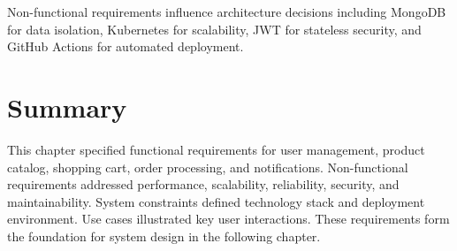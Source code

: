 Non-functional requirements influence architecture decisions including MongoDB for data isolation, Kubernetes for scalability, JWT for stateless security, and GitHub Actions for automated deployment.

\section{Summary}

This chapter specified functional requirements for user management, product catalog, shopping cart, order processing, and notifications. Non-functional requirements addressed performance, scalability, reliability, security, and maintainability. System constraints defined technology stack and deployment environment. Use cases illustrated key user interactions. These requirements form the foundation for system design in the following chapter.
